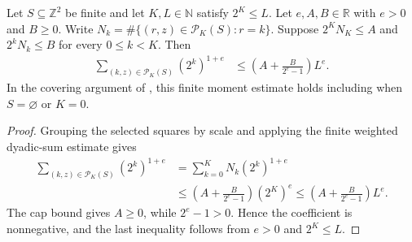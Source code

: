 \begin{lemma}
    \label{thm:area_law_capped_dyadic_moment}
    \leanok
    Let $S\subseteq\mathbb Z^2$ be finite and let $K,L\in\mathbb N$
    satisfy $2^K\le L$. Let $e,A,B\in\mathbb R$ with $e>0$ and $B\ge0$.
    Write $N_k=\#\{(r,z)\in\mathcal P_K(S):r=k\}$.
    Suppose $2^K N_K\le A$ and $2^k N_k\le B$ for every $0\le k<K$.
    Then
    \begin{align}
        \sum_{(k,z)\in\mathcal P_K(S)}(2^k)^{1+e}
         & \le\left(A+\frac{B}{2^e-1}\right)L^e.
    \end{align}
    In the covering argument of
    \cite[Lemma~9.4, lines~656--664]{OpenAI2026AreaLaw}, this finite moment
    estimate holds including when $S=\varnothing$ or $K=0$.
\end{lemma}
\begin{proof}\leanok
    Grouping the selected squares by scale and applying the finite weighted
    dyadic-sum estimate gives
    \begin{align}
        \sum_{(k,z)\in\mathcal P_K(S)}(2^k)^{1+e}
         & =\sum_{k=0}^{K}N_k(2^k)^{1+e}            \\
         & \le\left(A+\frac{B}{2^e-1}\right)(2^K)^e
        \le\left(A+\frac{B}{2^e-1}\right)L^e.
    \end{align}
    The cap bound gives $A\ge0$, while $2^e-1>0$. Hence the coefficient
    is nonnegative, and the last inequality follows from $e>0$ and $2^K\le L$.
\end{proof}

